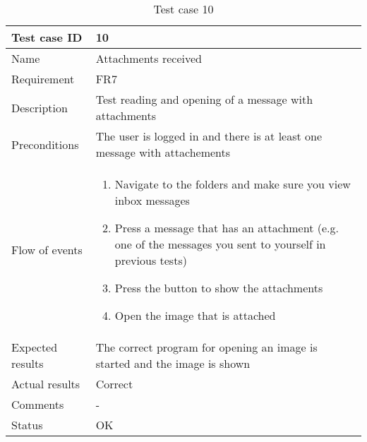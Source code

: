 		\begin{table}[htb]
			\begin{tabular}{l|p{10cm}}
				Test case ID & 10 \\ \hline
				Name & Attachments received\\ \hline
				Requirement & FR7\\ \hline
				Description & Test reading and opening of a message with attachments\\ \hline
				Preconditions & The user is logged in and there is at least one message with attachements\\ \hline
				Flow of events & 
					\begin{enumerate}
						\item{}Navigate to the folders and make sure you view inbox messages
						\item{}Press a message that has an attachment (e.g. one of the messages you sent to yourself in previous tests)
						\item{}Press the button to show the attachments
						\item{}Open the image that is attached
					\end{enumerate} \\ \hline
				Expected results & The correct program for opening an image is started and the image is shown \\ \hline
				Actual results &Correct\\ \hline
				Comments &-\\ \hline
				Status &OK \\ \hline
			\end{tabular}
			\caption{Test case 10} \label{tab:case10}
		\end{table}

